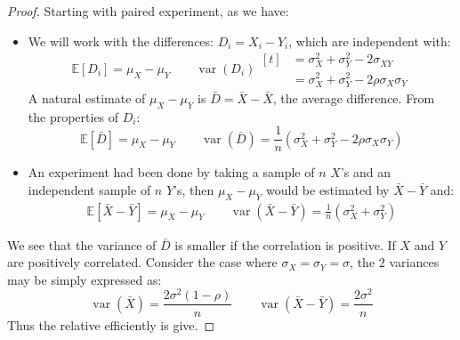 \begin{proof}
    Starting with paired experiment, as we have:
    \begin{itemize}
        \item We will work with the differences: $D_i = X_i - Y_i$, which are independent with:
        \begin{equation*}
            \mathbb{E}[D_i] = \mu_X - \mu_Y \qquad \operatorname{var}(D_i)\begin{aligned}[t]   
                &=\sigma^2_X + \sigma^2_Y - 2\sigma_{XY} \\
                &=\sigma_X^2 + \sigma^2_Y - 2\rho\sigma_X\sigma_Y
            \end{aligned}
        \end{equation*}
        A natural estimate of $\mu_X - \mu_Y$ is $\bar{D} = \bar{X}-\bar{X}$, the average difference. From the properties of $D_i$:
        \begin{equation*}
            \mathbb{E}[\bar{D}] = \mu_X - \mu_Y \qquad \operatorname{var}(\bar{D}) = \frac{1}{n}(\sigma^2_X + \sigma^2_Y - 2\rho\sigma_X\sigma_Y)
        \end{equation*}
        \item An experiment had been done by taking a sample of $n$ $X$'s and an independent sample of $n$ $Y$'s, then $\mu_X - \mu_Y$ would be estimated by $\bar{X} -\bar{Y}$ and:
        \begin{equation*}
        \begin{aligned}
            \mathbb{E}[\bar{X} - \bar{Y}] = \mu_X - \mu_Y \qquad \operatorname{var}(\bar{X} - \bar{Y}) = \frac{1}{n}(\sigma^2_X + \sigma^2_Y)
        \end{aligned}
        \end{equation*}
    \end{itemize}
    We see that the variance of $\bar{D}$ is smaller if the correlation is positive. If $X$ and $Y$ are positively correlated. Consider the case where $\sigma_X = \sigma_Y = \sigma$, the $2$ variances may be simply expressed as:
    \begin{equation*}
        \operatorname{var}(\bar{X}) = \frac{2\sigma^2(1-\rho)}{n} \qquad \operatorname{var}(\bar{X}-\bar{Y}) = \frac{2\sigma^2}{n}
    \end{equation*}
    Thus the relative efficiently is give. 
\end{proof}

